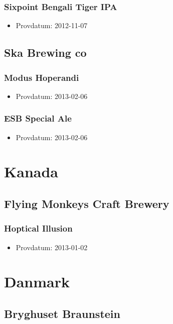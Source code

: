 \documentclass[11pt]{article}
\begin{document}
\subsubsection{Sixpoint Bengali Tiger IPA}
\label{sec:orged89dea}
\begin{itemize}
\item Provdatum: 2012-11-07
\end{itemize}
\subsection{Ska Brewing co}
\label{sec:org5a6c769}
\subsubsection{Modus Hoperandi}
\label{sec:orgb12b71a}
\begin{itemize}
\item Provdatum: 2013-02-06
\end{itemize}
\subsubsection{ESB Special Ale}
\label{sec:org64dd322}
\begin{itemize}
\item Provdatum: 2013-02-06
\end{itemize}
\section{Kanada}
\label{sec:org784901e}
\subsection{Flying Monkeys Craft Brewery}
\label{sec:org882fcee}
\subsubsection{Hoptical Illusion}
\label{sec:orga3208e7}
\begin{itemize}
\item Provdatum: 2013-01-02
\end{itemize}
\section{Danmark}
\label{sec:org421355a}
\subsection{Bryghuset Braunstein}
\label{sec:orgeff0809}
\end{document}
